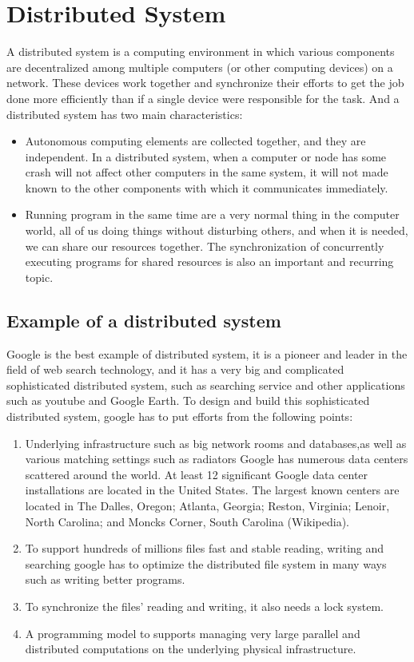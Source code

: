 \documentclass[11pt]{book}
\begin{document}
 \section{Distributed System}
 A distributed system is a computing environment in which various components are decentralized
among multiple computers (or other computing devices) on a network. 
These devices work together and synchronize their efforts to get the job done more efficiently 
than if a single device were responsible for the task.
And a distributed system has two main characteristics:
\begin{itemize}
    \item Autonomous computing elements are collected together, and they are independent. In a distributed system,
    when a computer or node has some crash will not affect other computers in the same system,
	it will not  made known to the other components with which it communicates immediately. 
    \item Running program in the same time are a very normal thing in the computer world, all 
	of us doing things without disturbing others, and when it is needed, we can share our resources together.
	The synchronization of concurrently executing programs for shared resources is also an important and recurring topic.
\end{itemize}

\subsection{Example of a distributed system}
Google is the best example of distributed system, it is a pioneer and leader in the field of web search technology,
and it has a very big and complicated sophisticated distributed system, such as searching service and other applications such as youtube and Google Earth.
To design and build this sophisticated distributed system, google has to put efforts from the following points:
\begin{enumerate}
    \item Underlying infrastructure such as big network rooms and databases,as well as various matching settings such as radiators
	Google has numerous data centers scattered around the world. 
	At least 12 significant Google data center installations are located in the United States. 
	The largest known centers are located in The Dalles, Oregon; Atlanta, Georgia; Reston, Virginia; Lenoir, North Carolina; and Moncks Corner, South Carolina (Wikipedia).
    \item To support hundreds of millions files fast and stable reading, writing and searching 
       google has to optimize the distributed file system in many ways such as writing better programs.
    \item To synchronize the files' reading and writing, it also needs a lock system.
    \item A programming model to supports managing very large parallel and distributed computations on the underlying physical infrastructure.
\end{enumerate}
\end{document}

